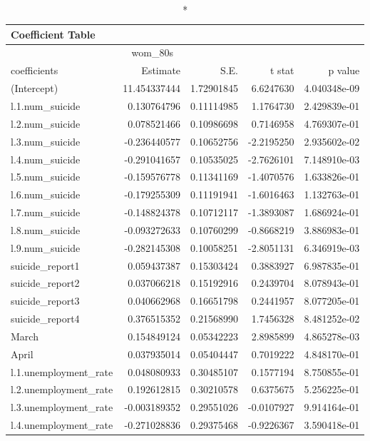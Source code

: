 \begin{longtable}{lrrrr}
\caption*{
{\large Coefficient Table}
} \\ 
\toprule
\multicolumn{4}{c}{wom\_80s} &  \\ 
\cmidrule(lr){1-4}
coefficients & Estimate & S.E. & t stat & p value \\ 
\midrule\addlinespace[2.5pt]
(Intercept) & 11.454337444 & 1.72901845 & 6.6247630 & 4.040348e-09 \\ 
l.1.num\_suicide & 0.130764796 & 0.11114985 & 1.1764730 & 2.429839e-01 \\ 
l.2.num\_suicide & 0.078521466 & 0.10986698 & 0.7146958 & 4.769307e-01 \\ 
l.3.num\_suicide & -0.236440577 & 0.10652756 & -2.2195250 & 2.935602e-02 \\ 
l.4.num\_suicide & -0.291041657 & 0.10535025 & -2.7626101 & 7.148910e-03 \\ 
l.5.num\_suicide & -0.159576778 & 0.11341169 & -1.4070576 & 1.633826e-01 \\ 
l.6.num\_suicide & -0.179255309 & 0.11191941 & -1.6016463 & 1.132763e-01 \\ 
l.7.num\_suicide & -0.148824378 & 0.10712117 & -1.3893087 & 1.686924e-01 \\ 
l.8.num\_suicide & -0.093272633 & 0.10760299 & -0.8668219 & 3.886983e-01 \\ 
l.9.num\_suicide & -0.282145308 & 0.10058251 & -2.8051131 & 6.346919e-03 \\ 
suicide\_report1 & 0.059437387 & 0.15303424 & 0.3883927 & 6.987835e-01 \\ 
suicide\_report2 & 0.037066218 & 0.15192916 & 0.2439704 & 8.078943e-01 \\ 
suicide\_report3 & 0.040662968 & 0.16651798 & 0.2441957 & 8.077205e-01 \\ 
suicide\_report4 & 0.376515352 & 0.21568990 & 1.7456328 & 8.481252e-02 \\ 
March & 0.154849124 & 0.05342223 & 2.8985899 & 4.865278e-03 \\ 
April & 0.037935014 & 0.05404447 & 0.7019222 & 4.848170e-01 \\ 
l.1.unemployment\_rate & 0.048080933 & 0.30485107 & 0.1577194 & 8.750855e-01 \\ 
l.2.unemployment\_rate & 0.192612815 & 0.30210578 & 0.6375675 & 5.256225e-01 \\ 
l.3.unemployment\_rate & -0.003189352 & 0.29551026 & -0.0107927 & 9.914164e-01 \\ 
l.4.unemployment\_rate & -0.271028836 & 0.29375468 & -0.9226367 & 3.590418e-01 \\ 

\end{longtable}
